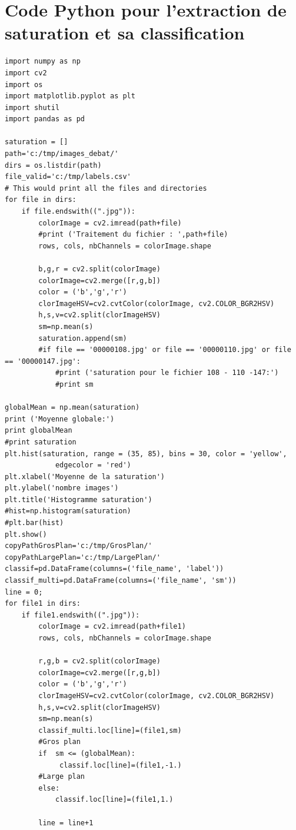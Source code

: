 \documentclass{book}
\begin{document}
\chapter{Code Python pour l'extraction de saturation et sa classification}\label{code_python_saturation}
\begin{verbatim}
import numpy as np
import cv2
import os
import matplotlib.pyplot as plt
import shutil
import pandas as pd

saturation = []
path='c:/tmp/images_debat/'
dirs = os.listdir(path)
file_valid='c:/tmp/labels.csv'
# This would print all the files and directories
for file in dirs:
    if file.endswith((".jpg")):
        colorImage = cv2.imread(path+file)
        #print ('Traitement du fichier : ',path+file)
        rows, cols, nbChannels = colorImage.shape

        b,g,r = cv2.split(colorImage)
        colorImage=cv2.merge([r,g,b])
        color = ('b','g','r')
        clorImageHSV=cv2.cvtColor(colorImage, cv2.COLOR_BGR2HSV)
        h,s,v=cv2.split(clorImageHSV)
        sm=np.mean(s)
        saturation.append(sm)
        #if file == '00000108.jpg' or file == '00000110.jpg' or file == '00000147.jpg':
            #print ('saturation pour le fichier 108 - 110 -147:')
            #print sm

globalMean = np.mean(saturation)
print ('Moyenne globale:')
print globalMean
#print saturation
plt.hist(saturation, range = (35, 85), bins = 30, color = 'yellow',
            edgecolor = 'red')
plt.xlabel('Moyenne de la saturation')
plt.ylabel('nombre images')
plt.title('Histogramme saturation')
#hist=np.histogram(saturation)
#plt.bar(hist)
plt.show()
copyPathGrosPlan='c:/tmp/GrosPlan/'
copyPathLargePlan='c:/tmp/LargePlan/'
classif=pd.DataFrame(columns=('file_name', 'label'))
classif_multi=pd.DataFrame(columns=('file_name', 'sm'))
line = 0;
for file1 in dirs:
    if file1.endswith((".jpg")):
        colorImage = cv2.imread(path+file1)
        rows, cols, nbChannels = colorImage.shape

        r,g,b = cv2.split(colorImage)
        colorImage=cv2.merge([r,g,b])
        color = ('b','g','r')
        clorImageHSV=cv2.cvtColor(colorImage, cv2.COLOR_BGR2HSV)
        h,s,v=cv2.split(clorImageHSV)
        sm=np.mean(s)
        classif_multi.loc[line]=(file1,sm)
        #Gros plan
        if  sm <= (globalMean):
             classif.loc[line]=(file1,-1.)            
        #Large plan
        else:
            classif.loc[line]=(file1,1.)            
        
        line = line+1


\end{verbatim}
\end{document}
